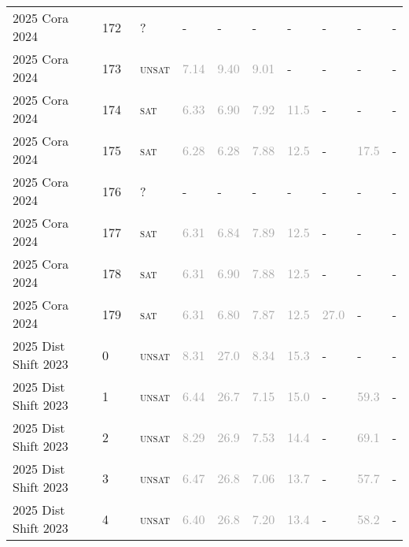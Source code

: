\begin{center}
{\begin{longtable}{@{}llllllllll@{}}
2025 Cora 2024 & 172 & ~? & - & - & - & - & - & - & - \\
2025 Cora 2024 & 173 & ~\textsc{unsat} & \textcolor{darkgray}{7.14} & \textcolor{darkgray}{9.40} & \textcolor{darkgray}{9.01} & - & - & - & - \\
2025 Cora 2024 & 174 & ~\textsc{sat} & \textcolor{darkgray}{6.33} & \textcolor{darkgray}{6.90} & \textcolor{darkgray}{7.92} & \textcolor{darkgray}{11.5} & - & - & - \\
2025 Cora 2024 & 175 & ~\textsc{sat} & \textcolor{darkgray}{6.28} & \textcolor{darkgray}{6.28} & \textcolor{darkgray}{7.88} & \textcolor{darkgray}{12.5} & - & \textcolor{darkgray}{17.5} & - \\
2025 Cora 2024 & 176 & ~? & - & - & - & - & - & - & - \\
2025 Cora 2024 & 177 & ~\textsc{sat} & \textcolor{darkgray}{6.31} & \textcolor{darkgray}{6.84} & \textcolor{darkgray}{7.89} & \textcolor{darkgray}{12.5} & - & - & - \\
2025 Cora 2024 & 178 & ~\textsc{sat} & \textcolor{darkgray}{6.31} & \textcolor{darkgray}{6.90} & \textcolor{darkgray}{7.88} & \textcolor{darkgray}{12.5} & - & - & - \\
2025 Cora 2024 & 179 & ~\textsc{sat} & \textcolor{darkgray}{6.31} & \textcolor{darkgray}{6.80} & \textcolor{darkgray}{7.87} & \textcolor{darkgray}{12.5} & \textcolor{darkgray}{27.0} & - & - \\
\midrule
2025 Dist Shift 2023 & 0 & ~\textsc{unsat} & \textcolor{darkgray}{8.31} & \textcolor{darkgray}{27.0} & \textcolor{darkgray}{8.34} & \textcolor{darkgray}{15.3} & - & - & - \\
2025 Dist Shift 2023 & 1 & ~\textsc{unsat} & \textcolor{darkgray}{6.44} & \textcolor{darkgray}{26.7} & \textcolor{darkgray}{7.15} & \textcolor{darkgray}{15.0} & - & \textcolor{darkgray}{59.3} & - \\
2025 Dist Shift 2023 & 2 & ~\textsc{unsat} & \textcolor{darkgray}{8.29} & \textcolor{darkgray}{26.9} & \textcolor{darkgray}{7.53} & \textcolor{darkgray}{14.4} & - & \textcolor{darkgray}{69.1} & - \\
2025 Dist Shift 2023 & 3 & ~\textsc{unsat} & \textcolor{darkgray}{6.47} & \textcolor{darkgray}{26.8} & \textcolor{darkgray}{7.06} & \textcolor{darkgray}{13.7} & - & \textcolor{darkgray}{57.7} & - \\
2025 Dist Shift 2023 & 4 & ~\textsc{unsat} & \textcolor{darkgray}{6.40} & \textcolor{darkgray}{26.8} & \textcolor{darkgray}{7.20} & \textcolor{darkgray}{13.4} & - & \textcolor{darkgray}{58.2} & - \\

\end{longtable}}
\end{center}
